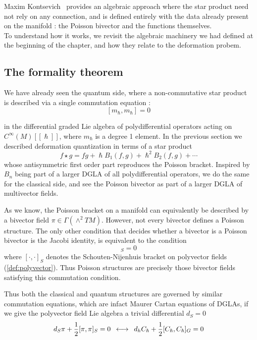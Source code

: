 \documentclass[
  12pt,
  a4paper, oneside
]{report}
\renewcommand{\hbar}{\hslash}
\theoremstyle{bolddef}
\theoremstyle{remark}
\numberwithin{equation}{chapter}
\begin{document}
Maxim Kontsevich~\cite{Kontsevich2003} provides an algebraic approach where the star product need not rely on any connection, and is defined entirely with the data already present on the manifold : the Poisson bivector and the functions themselves. \\
To understand how it works, we revisit the algebraic machinery we had defined at the beginning of the chapter, and how they relate to the deformation probem. 

\subsection{The formality theorem}
We have already seen the quantum side, where a non-commutative star product is described via a single commutation equation :
$$
[m_{\hbar},m_{\hbar}] = 0
$$

in the differential graded Lie algebra of polydifferential operators acting on $C^\infty(M)[[\hbar]]$, where $m_{\hbar}$ is a degree 1 element.
In the previous section we described deformation quantization in terms of a star
product
$$
f \star g = fg + \hbar B_1(f,g) + \hbar^2 B_2(f,g) + \cdots
$$
whose antisymmetric first order part reproduces the Poisson bracket. 
Inspired by $B_{n}$ being part of a larger DGLA of all polydifferential operators, we do the same for the classical side, and see the Poisson bivector as part of a larger DGLA of multivector fields. 

As we know, the Poisson bracket on a manifold can equivalently be described by a bivector field $\pi \in \Gamma(\wedge^2 TM)$. However, not every bivector defines a Poisson structure. The only other condition that decides whether a bivector is a Poisson bivector is the Jacobi identity, is equivalent to the condition
\begin{equation}
[\pi,\pi]_S = 0 
\end{equation}
where $[\cdot,\cdot]_S$ denotes the Schouten-Nijenhuis bracket on polyvector fields (\ref{def:polyvector}). Thus Poisson structures are precisely those bivector fields satisfying
this commutation condition.

Thus both the classical and quantum structures are governed by similar
commutation equations, which are infact Maurer Cartan equations of DGLAs, if we give the polyvector field Lie algebra a trivial differential $d_{S} = 0$
\begin{equation}
  d_{S}\pi + \frac{1}{2}[\pi,\pi]_{S} = 0 \enskip \longleftrightarrow \enskip d_{h}C_{\hbar} + \frac{1}{2}[C_{\hbar},C_{\hbar}]_{G} = 0
\end{equation}
\end{document}
